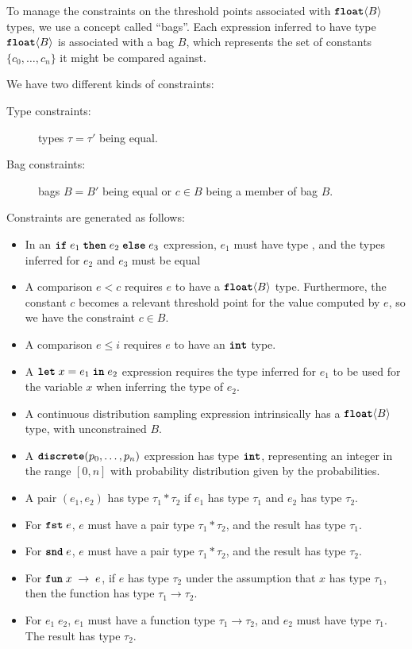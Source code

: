 \documentclass[acmsmall,screen,dvipsnames,x11names,nonacm,anonymous,review]{acmart}
\newcommand{\letkw}{\text{\ttfamily\bfseries let}}
\newcommand{\inkw}{\text{\ttfamily\bfseries in}}
\newcommand{\ifkw}{\text{\ttfamily\bfseries if}}
\newcommand{\thenkw}{\text{\ttfamily\bfseries then}}
\newcommand{\elsekw}{\text{\ttfamily\bfseries else}}
\newcommand{\discrete}{\text{\ttfamily\bfseries discrete}}
\newcommand{\fstkw}{\text{\ttfamily\bfseries fst}}
\newcommand{\sndkw}{\text{\ttfamily\bfseries snd}}
\newcommand{\funkw}{\text{\ttfamily\bfseries fun}}
\newcommand{\bool}{\text{\ttfamily\bfseries bool}}
\newcommand{\intty}{\text{\ttfamily\bfseries int}}
\newcommand{\float}{\text{\ttfamily\bfseries float}}
\begin{document}
To manage the constraints on the threshold points associated with $\float\langle B \rangle$ types, we use a concept called ``bags''. Each expression inferred to have type $\float\langle B \rangle$ is associated with a bag $B$, which represents the set of constants $\{c_0, \dots, c_n\}$ it might be compared against. 

We have two different kinds of constraints:
\begin{description}
    \item[Type constraints:] types $\tau=\tau'$ being equal.
    \item[Bag constraints:] bags $B=B'$ being equal or $c \in B$ being a member of bag $B$.
\end{description}

Constraints are generated as follows:
\begin{itemize}
    \item In an $\ifkw \; e_1\; \thenkw \; e_2\; \elsekw \; e_3$ expression, $e_1$ must have type \bool, and the types inferred for $e_2$ and $e_3$ must be equal
    \item A comparison $e < c$ requires $e$ to have a $\float\langle B \rangle$ type. Furthermore, the constant $c$ becomes a relevant threshold point for the value computed by $e$, so we have the constraint $c \in B$.
    \item A comparison $e \leq i$ requires $e$ to have an $\intty$ type.
    \item A $\letkw \; x = e_1 \; \inkw \; e_2$ expression requires the type inferred for $e_1$ to be used for the variable $x$ when inferring the type of $e_2$.
    \item A continuous distribution sampling expression intrinsically has a $\float\langle B \rangle$ type, with unconstrained $B$.
    \item A $\discrete(p_0, \ldots, p_n)$ expression has type $\intty$, representing an integer in the range $[0,n]$ with probability distribution given by the probabilities.
    \item A pair $(e_1, e_2)$ has type $\tau_1 * \tau_2$ if $e_1$ has type $\tau_1$ and $e_2$ has type $\tau_2$.
    \item For $\fstkw \; e$, $e$ must have a pair type $\tau_1 * \tau_2$, and the result has type $\tau_1$.
    \item For $\sndkw \; e$, $e$ must have a pair type $\tau_1 * \tau_2$, and the result has type $\tau_2$.
    \item For $\funkw \; x \; \rightarrow \; e$, if $e$ has type $\tau_2$ under the assumption that $x$ has type $\tau_1$, then the function has type $\tau_1 \rightarrow \tau_2$.
    \item For $e_1 \; e_2$, $e_1$ must have a function type $\tau_1 \rightarrow \tau_2$, and $e_2$ must have type $\tau_1$. The result has type $\tau_2$.
\end{itemize}
\end{document}
